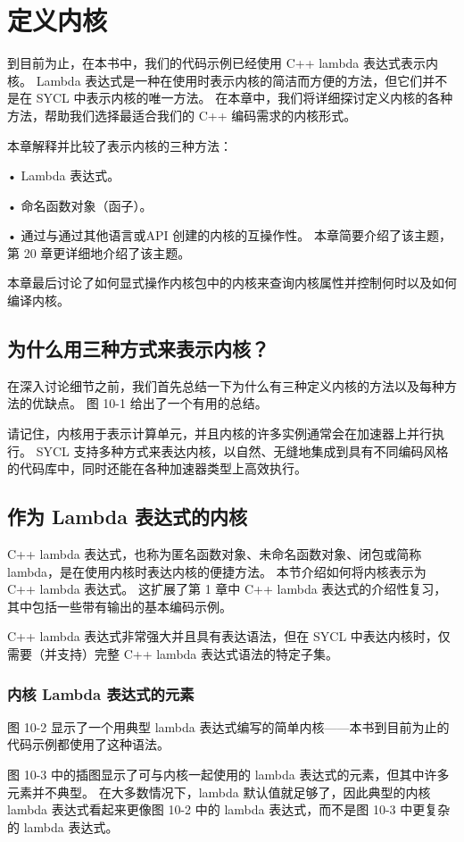 \section{定义内核}
到目前为止，在本书中，我们的代码示例已经使用 C++ lambda 表达式表示内核。 Lambda 表达式是一种在使用时表示内核的简洁而方便的方法，但它们并不是在 SYCL 中表示内核的唯一方法。 在本章中，我们将详细探讨定义内核的各种方法，帮助我们选择最适合我们的 C++ 编码需求的内核形式。

本章解释并比较了表示内核的三种方法：

• Lambda 表达式。

• 命名函数对象（函子）。

• 通过与通过其他语言或API 创建的内核的互操作性。 本章简要介绍了该主题，第 20 章更详细地介绍了该主题。

本章最后讨论了如何显式操作内核包中的内核来查询内核属性并控制何时以及如何编译内核。


\subsection{为什么用三种方式来表示内核？}
在深入讨论细节之前，我们首先总结一下为什么有三种定义内核的方法以及每种方法的优缺点。 图 10-1 给出了一个有用的总结。

请记住，内核用于表示计算单元，并且内核的许多实例通常会在加速器上并行执行。 SYCL 支持多种方式来表达内核，以自然、无缝地集成到具有不同编码风格的代码库中，同时还能在各种加速器类型上高效执行。

\subsection{作为 Lambda 表达式的内核}
C++ lambda 表达式，也称为匿名函数对象、未命名函数对象、闭包或简称 lambda，是在使用内核时表达内核的便捷方法。 本节介绍如何将内核表示为 C++ lambda 表达式。 这扩展了第 1 章中 C++ lambda 表达式的介绍性复习，其中包括一些带有输出的基本编码示例。

C++ lambda 表达式非常强大并且具有表达语法，但在 SYCL 中表达内核时，仅需要（并支持）完整 C++ lambda 表达式语法的特定子集。

\subsubsection{内核 Lambda 表达式的元素}
图 10-2 显示了一个用典型 lambda 表达式编写的简单内核——本书到目前为止的代码示例都使用了这种语法。

图 10-3 中的插图显示了可与内核一起使用的 lambda 表达式的元素，但其中许多元素并不典型。 在大多数情况下，lambda 默认值就足够了，因此典型的内核 lambda 表达式看起来更像图 10-2 中的 lambda 表达式，而不是图 10-3 中更复杂的 lambda 表达式。

